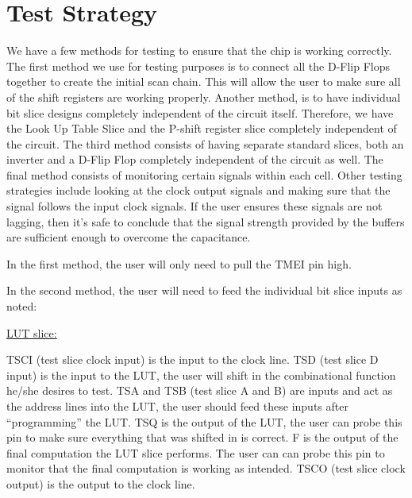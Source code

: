 \documentclass[a4paper]{article}
\begin{document}


\section{\textbf{Test Strategy}}
    We have a few methods for testing to ensure that the chip is working correctly. The first method we use for testing purposes
    is to connect all the D-Flip Flops together to create the initial scan chain. This will allow the user to make sure all of
    the shift registers are working properly. Another method, is to have individual bit slice designs completely independent of
    the circuit itself. Therefore, we have the Look Up Table Slice and the P-shift register slice completely independent of the
    circuit. The third method consists of having separate standard slices, both an inverter and a D-Flip Flop completely independent
    of the circuit as well. The final method consists of monitoring certain signals within each cell. Other testing strategies include
    looking at the clock output signals and making sure that the signal follows the input clock signals. If the user ensures these
    signals are not lagging, then it's safe to conclude that the signal strength provided by the buffers are sufficient enough to
    overcome the capacitance.

    In the first method, the user will only need to pull the TMEI pin high.

    In the second method, the user will need to feed the individual bit slice inputs as noted:

    \underline{LUT slice:}

    TSCI (test slice clock input) is the input to the clock line. \newline
    TSD (test slice D input) is the input to the LUT, the user will shift in the combinational function he/she desires to test. \newline
    TSA and TSB (test slice A and B) are inputs and act as the address lines into the LUT, the user should feed these inputs after
    ``programming'' the LUT. \newline
    TSQ is the output of the LUT, the user can probe this pin to make sure everything that was shifted in is correct. \newline
    F is the output of the final computation the LUT slice performs. The user can can probe this pin to monitor that \newline
    the final computation is working as intended. \newline
    TSCO (test slice clock output) is the output to the clock line.
\end{document}
